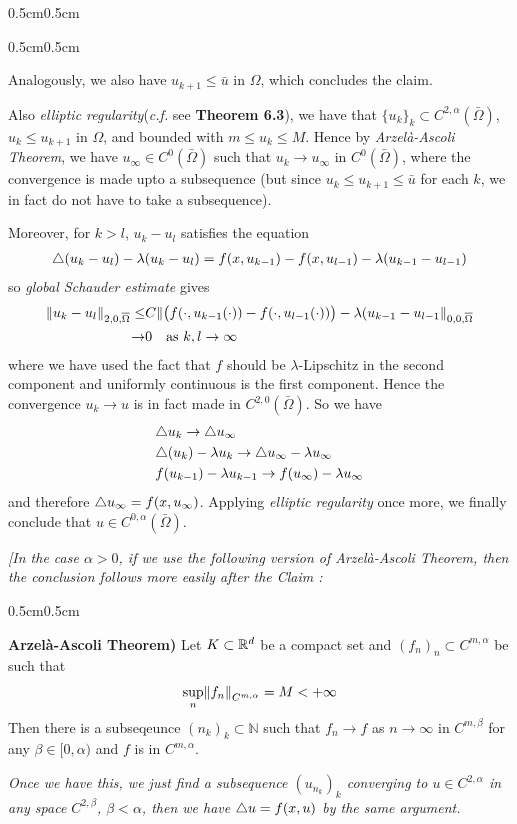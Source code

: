 \documentclass[12pt,a4paper]{article}
\newenvironment{proof}
{\begin{changemargin}{0.5cm}{0.5cm} 
	}%
	{\end{changemargin}
}
\newenvironment{subproof}
{\begin{changemargin}{0.5cm}{0.5cm} 
	}%
	{\end{changemargin}
}
\newenvironment{p}
{\begin{proof} 
	}%
	{\end{proof}
}
\begin{document}
\begin{p}
\begin{subproof}
\quad Analogously, we also have $u_{k+1} \leq \bar{u}$ in $\Omega$, which concludes the claim.
\end{subproof}

Also \emph{elliptic regularity}(\textit{c.f.} see \textbf{Theorem 6.3}), we have that $\{u_k\}_k \subset C^{2, \alpha}(\bar{\Omega})$, $u_k \leq u_{k+1}$ in $\Omega$, and bounded with $m\leq u_k \leq M$. Hence by \emph{Arzel\`a-Ascoli Theorem}, we have $u_{\infty} \in C^{0}(\bar{\Omega})$ such that $u_k \rightarrow u_{\infty}$ in $C^0(\bar{\Omega})$, where the convergence is made upto a subsequence (but since $u_k \leq u_{k+1} \leq \bar{u}$ for each $k$, we in fact do not have to take a subsequence).

\quad Moreover, for $k>l$, $u_k -u_l$ satisfies the equation
\begin{align*}
\triangle (u_k - u_l) - \lambda(u_k -u_l) = f(x, u_{k-1}) - f(x, u_{l-1}) - \lambda(u_{k-1}- u_{l-1})
\end{align*}
so \emph{global Schauder estimate} gives
\begin{align*}
\snorms{u_k - u_l}{2, 0, \bar{\Omega}} \leq & C \snorms{ \big( f(\cdot, u_{k-1}(\cdot)) - f(\cdot, u_{l-1}(\cdot)) \big) - \lambda (u_{k-1} - u_{l-1}}{0, 0, \bar{\Omega}} \\
\rightarrow & 0 \quad \text{as } k,l\rightarrow \infty
\end{align*}
where we have used the fact that $f$ should be $\lambda$-Lipschitz in the second component and uniformly continuous is the first component. Hence the convergence $u_k \rightarrow u$ is in fact made in $C^{2,0}(\bar{\Omega})$. So we have
\begin{align*}
& \triangle u_{k} \rightarrow \triangle u_{\infty}\\
& \triangle(u_{k}) - \lambda u_{k} \rightarrow \triangle u_{\infty} - \lambda u_{\infty} \\
& f(u_{k-1}) - \lambda u_{k-1} \rightarrow f(u_{\infty}) - \lambda u_{\infty}
\end{align*}
and therefore $\triangle u_{\infty} = f(x, u_{\infty})$. Applying \emph{elliptic regularity} once more, we finally conclude that $u\in C^{0, \alpha}(\bar{\Omega})$.
\s

\emph{[In the case $\alpha>0$, if we use the following version of Arzel\`a-Ascoli Theorem, then the conclusion follows more easily after the Claim :}
\begin{subproof}
\textbf{Arzel\`a-Ascoli Theorem)} Let $K \subset \mathbb{R}^d$ be a compact set and $(f_n)_n \subset C^{m, \alpha}$ be such that
\begin{align*}
\sup_{n} \snorms{f_n}{C^{m, \alpha}} = M < +\infty
\end{align*} 
Then there is a subseqeunce $(n_k)_k \subset \mathbb{N}$ such that $f_n \rightarrow f$ as $n\rightarrow \infty$ in $C^{m, \beta}$ for any $\beta \in [0, \alpha)$ and $f$ is in $C^{m, \alpha}$.
\end{subproof}
\emph{Once we have this, we just find a subsequence $(u_{n_k})_k$ converging to $u \in C^{2, \alpha}$ in any space $C^{2, \beta}$, $\beta < \alpha$, then we have $\triangle u = f(x, u)$ by the same argument.}
\s


\end{p}
\end{document}
